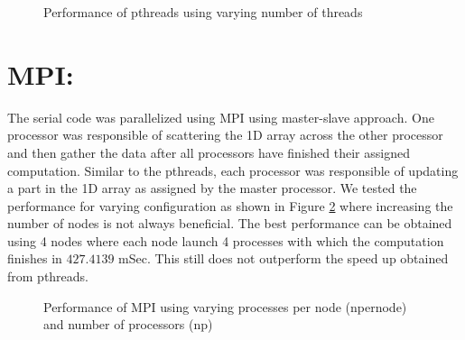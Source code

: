 \documentclass[12pt] {article}
\begin{document}
\begin{figure}[!tbh]
 \centering        
     \caption{Performance of pthreads using varying number of threads}
   \label{fig:pth}
\end{figure}  

\section{MPI:}
The serial code was parallelized using MPI using master-slave approach. One processor was responsible of scattering the 1D array across the other processor and then gather the data after all processors have finished their assigned computation. Similar to the pthreads, each processor was responsible of updating a part in the 1D array as assigned by the master processor. We tested the performance for varying configuration as shown in Figure \ref{fig:mpi} where increasing the number of nodes is not always beneficial. The best performance can be obtained using 4 nodes where each node launch 4 processes with which the computation finishes in $427.4139$ mSec. This still does not outperform the speed up obtained from pthreads. 


\begin{figure}[!tbh]
 \centering        
     \caption{Performance of MPI using varying processes per node (npernode) and number of processors (np)}
   \label{fig:mpi}
\end{figure} 
\end{document}
